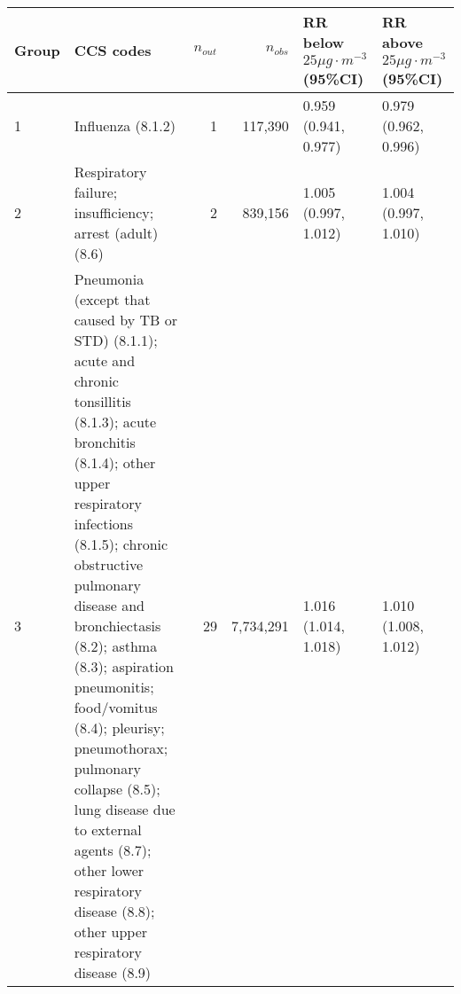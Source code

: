 \begin{tabular}{lp{6.5cm}rrp{2.2cm}p{2.2cm}}
  \hline
Group & CCS codes & $n_{out}$ & $n_{obs}$ & RR below $25 \mu g \cdot m^{-3}$ (95\%CI) & RR above $25 \mu g \cdot m^{-3}$ (95\%CI) \\ 
  \hline
   1 & Influenza (8.1.2) &    1 & 117,390 & 0.959 (0.941, 0.977) & 0.979 (0.962, 0.996) \\ 
     2 & Respiratory failure; insufficiency; arrest (adult) (8.6) &    2 & 839,156 & 1.005 (0.997, 1.012) & 1.004 (0.997, 1.010) \\ 
     3 & Pneumonia (except that caused by TB or STD) (8.1.1); acute and chronic tonsillitis (8.1.3); acute bronchitis (8.1.4); other upper respiratory infections (8.1.5); chronic obstructive pulmonary disease and bronchiectasis (8.2); asthma (8.3); aspiration pneumonitis; food/vomitus (8.4); pleurisy; pneumothorax; pulmonary collapse (8.5); lung disease due to external agents (8.7); other lower respiratory disease (8.8); other upper respiratory disease (8.9) &   29 & 7,734,291 & 1.016 (1.014, 1.018) & 1.010 (1.008, 1.012) \\ 
   \hline
\end{tabular}

